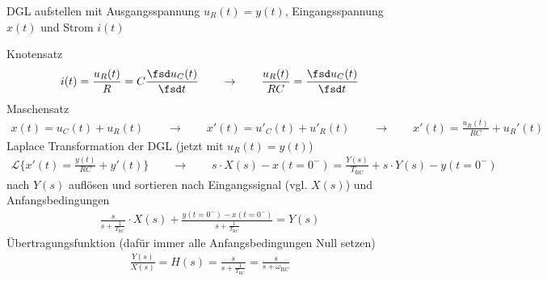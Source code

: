 \begin{Ansatz}
DGL aufstellen mit Ausgangsspannung $u_R(t) = y(t)$, Eingangsspannung $x(t)$ und Strom $i(t)$

\noindent Knotensatz
\begin{align}
i(t) = \frac{u_R(t)}{R} = C\frac{\fsd u_C(t)}{\fsd t} \qquad\rightarrow\qquad \frac{u_R(t)}{R C} = \frac{\fsd u_C(t)}{\fsd t}
\end{align}
%
Maschensatz
\begin{align}
x(t) = u_C(t) + u_R(t) \qquad\rightarrow\qquad x'(t) = u'_C(t) + u'_R(t) \qquad\rightarrow\qquad
x'(t) = \frac{u_R(t)}{R C} + u_R'(t)
\end{align}
%
Laplace Transformation der DGL (jetzt mit $u_R(t) = y(t)$)
\begin{align}
\mathcal{L}\{x'(t) = \frac{y(t)}{R C} + y'(t)\} \qquad\rightarrow\qquad
s \cdot X(s) - x(t=0^-) = \frac{Y(s)}{T_\text{RC}} + s \cdot Y(s) - y(t=0^-)
\end{align}
%
nach $Y(s)$ auflösen und sortieren nach Eingangssignal (vgl. $X(s)$) und Anfangsbedingungen
\begin{align}
\frac{s}{s + \frac{1}{T_\text{RC}}} \cdot X(s) + \frac{y(t=0^-) - x(t=0^-)}{s + \frac{1}{T_\text{RC}}} = Y(s)
\end{align}
%
Übertragungsfunktion (dafür immer alle Anfangsbedingungen Null setzen)
\begin{align}
\frac{Y(s)}{X(s)} = H(s) = \frac{s}{s + \frac{1}{T_\text{RC}}} = \frac{s}{s + \omega_\text{RC}}
\end{align}
%
\end{Ansatz}

\begin{figure}[h]
\begin{center}
\end{center}
\end{figure}

